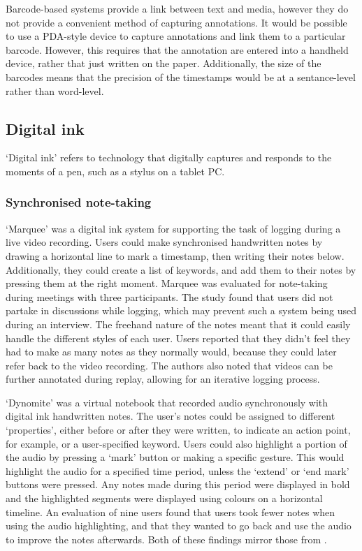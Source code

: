 Barcode-based systems provide a link between text and media, however they do not provide a convenient method of
capturing annotations. It would be possible to use a PDA-style device to capture annotations and link them to a
particular barcode. However, this requires that the annotation are entered into a handheld device, rather that just
written on the paper. Additionally, the size of the barcodes means that the precision of the timestamps would be at a
sentance-level rather than word-level.

\subsection{Digital ink}
`Digital ink' refers to technology that digitally captures and responds to the moments of a pen, such as a stylus on a
tablet PC.

\subsubsection{Synchronised note-taking}
`Marquee' \citep{Weher1994} was a digital ink system for supporting the task of logging during a live video recording.
Users could make synchronised handwritten notes by drawing a horizontal line to mark a timestamp, then writing their
notes below.  Additionally, they could create a list of keywords, and add them to their notes by pressing them at the
right moment.  Marquee was evaluated for note-taking during meetings with three participants. The study found that
users did not partake in discussions while logging, which may prevent such a system being used during an interview.
The freehand nature of the notes meant that it could easily handle the different styles of each user.  Users reported
that they didn't feel they had to make as many notes as they normally would, because they could later refer back to the
video recording. The authors also noted that videos can be further annotated during replay, allowing for an iterative
logging process.

`Dynomite' \citep{Wilcox1997} was a virtual notebook that recorded audio synchronously with digital ink handwritten
notes. The user's notes could be assigned to different `properties', either before or after they were written, to
indicate an action point, for example, or a user-specified keyword.  Users could also highlight a portion of the audio
by pressing a `mark' button or making a specific gesture.  This would highlight the audio for a specified time period,
unless the `extend' or `end mark' buttons were pressed.  Any notes made during this period were displayed in bold and
the highlighted segments were displayed using colours on a horizontal timeline. An evaluation of nine users found that
users took fewer notes when using the audio highlighting, and that they wanted to go back and use the audio to improve
the notes afterwards. Both of these findings mirror those from \citet{Weher1994}.

